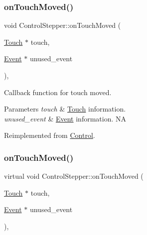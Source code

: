 \subsubsection{\texorpdfstring{on\+Touch\+Moved()}{onTouchMoved()}\hspace{0.1cm}{\footnotesize\ttfamily [1/2]}}
{\footnotesize\ttfamily void Control\+Stepper\+::on\+Touch\+Moved (\begin{DoxyParamCaption}\item[{\hyperlink{classTouch}{Touch} $\ast$}]{touch,  }\item[{\hyperlink{classEvent}{Event} $\ast$}]{unused\+\_\+event }\end{DoxyParamCaption})\hspace{0.3cm}{\ttfamily [override]}, {\ttfamily [virtual]}}

Callback function for touch moved.


\begin{DoxyParams}{Parameters}
{\em touch} & \hyperlink{classTouch}{Touch} information. \\
\hline
{\em unused\+\_\+event} & \hyperlink{classEvent}{Event} information.  NA \\
\hline
\end{DoxyParams}


Reimplemented from \hyperlink{classControl_a26d2e6af053319dc605949678f726622}{Control}.

\mbox{\label{classControlStepper_ae79c66bc7b2a2f44fbfe2fa3a5782ee9}} 
\subsubsection{\texorpdfstring{on\+Touch\+Moved()}{onTouchMoved()}\hspace{0.1cm}{\footnotesize\ttfamily [2/2]}}
{\footnotesize\ttfamily virtual void Control\+Stepper\+::on\+Touch\+Moved (\begin{DoxyParamCaption}\item[{\hyperlink{classTouch}{Touch} $\ast$}]{touch,  }\item[{\hyperlink{classEvent}{Event} $\ast$}]{unused\+\_\+event }\end{DoxyParamCaption})\hspace{0.3cm}{\ttfamily [override]}, {\ttfamily [virtual]}}

